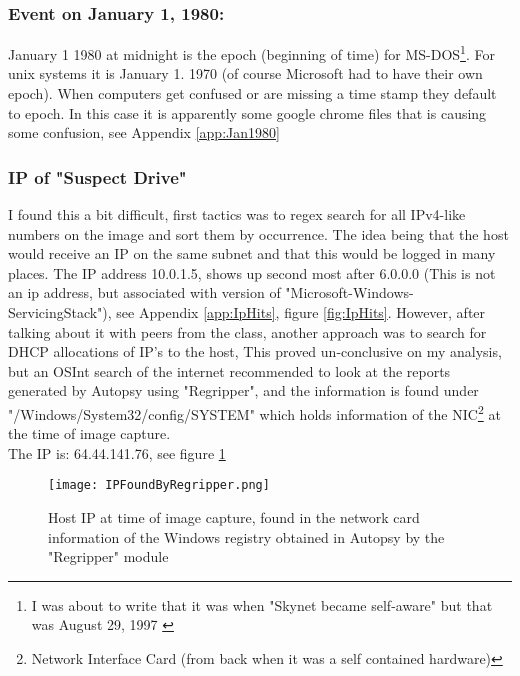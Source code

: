 \documentclass[
	letterpaper, %
	10pt, %
	unnumberedsections, %
	twoside, %
]{APAAssignment}
\begin{document}
\subsubsection{Event on January 1, 1980:}
January 1 1980 at midnight is the epoch (beginning of time) for MS-DOS\footnote{I was about to write that it was when "Skynet became self-aware" but that was August 29, 1997 \cite{enwiki:Terminator}}. For unix systems it is January 1. 1970 (of course Microsoft had to have their own epoch). When computers get confused or are missing a time stamp they default to epoch. In this case it is apparently some google chrome files that is causing some confusion, see Appendix \ref{app:Jan1980}

\subsubsection{IP of "Suspect Drive"}
I found this a bit difficult, first tactics was to regex search for all IPv4-like numbers on the image and sort them by occurrence. The idea being that the host would receive an IP on the same subnet and that this would be logged in many places. The IP address 10.0.1.5, shows up second most after 6.0.0.0 (This is not an ip address, but associated with version of "Microsoft-Windows-ServicingStack"), see Appendix \ref{app:IpHits}, figure \ref{fig:IpHits}. However, after talking about it with peers from the class, another approach was to search for DHCP allocations of IP's to the host, This proved un-conclusive on my analysis, but an OSInt search of the internet recommended to look at the reports generated by Autopsy using "Regripper", and the information is found under "/Windows/System32/config/SYSTEM" which holds information of the NIC\footnote{Network Interface Card (from back when it was a self contained hardware)} at the time of image capture. \\
The IP is: 64.44.141.76, see figure \ref{fig:IPregripReult}
\begin{figure}[!h] %
	\centering
	\texttt{[image: IPFoundByRegripper.png]}
	\caption{Host IP at time of image capture, found in the network card information of the Windows registry obtained in Autopsy by the "Regripper" module}
	\label{fig:IPregripReult}
\end{figure}
\end{document}
